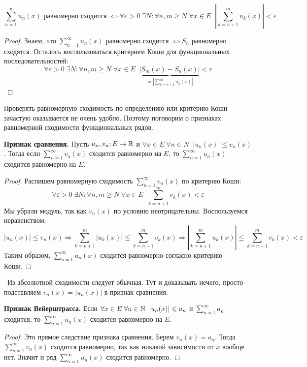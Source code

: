 \vspace*{7mm}

\begin{theorem} 
    \[ \sum_{n=1}^\infty u_n(x) \text{ равномерно сходится } \Longleftrightarrow \forall \varepsilon > 0 \; \exists N : \forall n,m \geqslant N \; \forall x \in E \;\; \left|\sum_{k=n+1}^m u_k(x)\right| < \varepsilon \]
\end{theorem}
\begin{proof}
    Знаем, что $ \sum\limits_{n=1}^\infty u_n(x)$ равномерно сходится $\Leftrightarrow S_n$ равномерно сходятся.
    Осталось воспользоваться критерием Коши для функциональных последовательностей:
    \[ \forall \varepsilon > 0 \; \exists N : \forall n,m \geqslant N \; \forall x \in E \;\; \underbrace{|S_m(x) - S_n(x)|}_{= \left|\sum\limits_{k=n+1}^m u_k(x)\right|} < \varepsilon  \] 
\end{proof}

Проверять равномерную сходимость по определению или критерию Коши зачастую оказывается не очень удобно.
Поэтому поговорим о признаках равномерной сходимости функциональных рядов.

\textbf{Признак сравнения.}
Пусть $u_n, v_n; E \to \mathbb{R}$ и $\forall x \in E \; \forall n \in N \;\; |u_n(x)| \leqslant v_n(x)$.
Тогда если $\sum\limits_{n = 1}^\infty v_n(x)$ сходится равномерно на $E$, то $\sum\limits_{n = 1}^\infty u_n(x)$ сходится равномерно на $E$.

\begin{proof}
    Распишем равномерную сходимость $\sum\limits_{n = 1}^\infty v_n(x)$ по критерию Коши:
    \[ \forall \varepsilon > 0 \; \exists N : \forall n,m \geqslant N \; \forall x \in E \;\; \sum_{k=n+1}^m v_k(x) < \varepsilon \]
    \quad Мы убрали модуль, так как $v_n(x)$ по условию неотрицательны.
    Воспользуемся неравенством: \[ |u_n(x)| \leqslant v_n(x) \Longrightarrow \sum_{k = n + 1}^m |u_k(x)| \leqslant \sum_{k = n+1}^m v_k(x) \Longrightarrow \left| \sum_{k = n + 1}^m u_k(x) \right| \leqslant \sum_{k = n+1}^m v_k(x) < \varepsilon \]
    \quad Таким образом, $\sum\limits_{n = 1}^\infty u_n(x)$ сходится равномерно согласно критерию Коши.
\end{proof}

\follow \, Из абсолютной сходимости следует обычная.
Тут и доказывать нечего, просто подставляем $v_n(x) = |u_n(x)|$ в признак сравнения. 

\vspace*{7mm}

\textbf{Признак Вейерштрасса.} 
Если $\forall x \in E \; \forall n \in \mathbb{N} \;\; |u_n(x)| \leqslant a_n$ и $\sum\limits_{n = 1}^\infty a_n$ сходится, то $\sum\limits_{n = 1}^\infty u_n(x)$ сходится равномерно на $E$.
\begin{proof}
    Это прямое следствие признака сравнения.
    Берем $v_n(x) = a_n$. 
    Тогда $\sum\limits_{n = 1}^\infty v_n(x)$ сходится равномерно, так как никакой зависимости от $x$ вообще нет.
    Значит и ряд $\sum\limits_{n = 1}^\infty u_n(x)$ сходится равномерно.
\end{proof}

